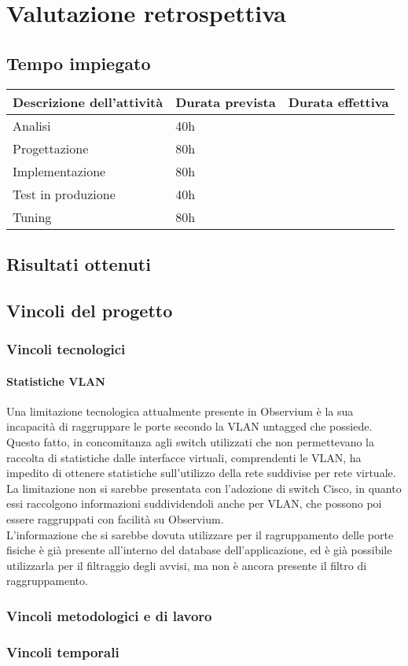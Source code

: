 \documentclass[Tesi.tex]{subfiles}
\begin{document}
\chapter{Valutazione retrospettiva}

\section{Tempo impiegato}
\begin{longtable}{|p{6cm}|p{3.5cm}|p{3.5cm}|}
	\hline
	{\bf Descrizione dell'attività} & {\bf Durata prevista} & {\bf Durata effettiva} \\
	\hline
	Analisi & 40h & \\
	\hline
	Progettazione & 80h & \\
	\hline
	Implementazione & 80h & \\
	\hline
	Test in produzione & 40h & \\
	\hline
	Tuning & 80h & \\
	\hline
	
\end{longtable}

\section{Risultati ottenuti}

\section{Vincoli del progetto}
\subsection{Vincoli tecnologici}
\subsubsection{Statistiche VLAN}
Una limitazione tecnologica attualmente presente in Observium è la sua incapacità di raggruppare le porte secondo la VLAN untagged che possiede. \\
Questo fatto, in concomitanza agli switch utilizzati che non permettevano la raccolta di statistiche dalle interfacce virtuali, comprendenti le VLAN, ha impedito di ottenere statistiche sull'utilizzo della rete suddivise per rete virtuale. \\
La limitazione non si sarebbe presentata con l'adozione di switch Cisco, in quanto essi raccolgono informazioni suddividendoli anche per VLAN, che possono poi essere raggruppati con facilità su Observium. \\
L'informazione che si sarebbe dovuta utilizzare per il ragruppamento delle porte fisiche è già presente all'interno del database dell'applicazione, ed è già possibile utilizzarla per il filtraggio degli avvisi, ma non è ancora presente il filtro di raggruppamento.

\subsection{Vincoli metodologici e di lavoro}

\subsection{Vincoli temporali}
\end{document}

